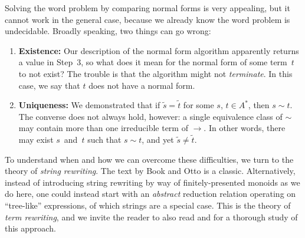 \documentclass[../generics]{subfiles}
\begin{document}
\begin{center}
\end{center}

Solving the word problem by comparing normal forms is very appealing, but it cannot work in the general case, because we already know the word problem is undecidable. Broadly speaking, two things can go wrong:
\begin{enumerate}
\item \textbf{Existence:} Our description of the normal form algorithm apparently returns a value in Step~3, so what does it mean for the normal form of some term~$t$ to not exist? The trouble is that the algorithm might not \emph{terminate}. In this case, we say that $t$ does not have a normal form.
\item \textbf{Uniqueness:} We demonstrated that if $\tilde{s}=\tilde{t}$ for some $s$, $t\in A^*$, then $s\sim t$. The converse does not always hold, however: a single equivalence class of $\sim$ may contain more than one irreducible term of $\rightarrow$. In other words, there may exist $s$~and~$t$ such that $s\sim t$, and yet $\tilde{s}\neq \tilde{t}$.
\end{enumerate}
To understand when and how we can overcome these difficulties, we turn to the theory of \emph{string rewriting}. The text by Book and Otto \cite{book2012string} is a classic. Alternatively, instead of introducing string rewriting by way of finitely-presented monoids as we do here, one could instead start with an \emph{abstract} reduction relation operating on ``tree-like'' expressions, of which strings are a special case. This is the theory of \emph{term rewriting}, and we invite the reader to also read \cite{andallthat} and \cite{formalmans6} for a thorough study of this approach.
\end{document}
